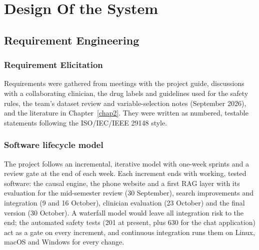 \chapter{Design Of the System}\label{chap4}
\newpage
\section{Requirement Engineering}
\subsection{Requirement Elicitation}
Requirements were gathered from meetings with the project guide, discussions with a collaborating clinician, the drug labels and guidelines used for the safety rules, the team's dataset review and variable-selection notes (September 2026), and the literature in Chapter~\ref{chap2}. They were written as numbered, testable statements following the ISO/IEC/IEEE 29148 style.

\subsection{Software lifecycle model}
The project follows an incremental, iterative model with one-week sprints and a review gate at the end of each week. Each increment ends with working, tested software: the causal engine, the phone website and a first RAG layer with its evaluation for the mid-semester review (30 September), search improvements and integration (9 and 16 October), clinician evaluation (23 October) and the final version (30 October). A waterfall model would leave all integration risk to the end; the automated safety tests (201 at present, plus 630 for the chat application) act as a gate on every increment, and continuous integration runs them on Linux, macOS and Windows for every change.

